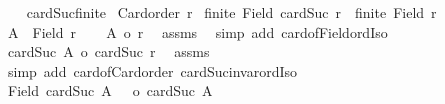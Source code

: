 \begin{isabellebody}
\ \ \isamarkupfalse%
\isanewline
{}\isamarkupfalse%
%
\endisatagproof
{\isafoldproof}%
%
\isadelimproof
\isanewline
%
\endisadelimproof
\isanewline
{}\isamarkupfalse%
\ cardSuc{\isacharunderscore}{\kern0pt}finite{\isacharcolon}{\kern0pt}\isanewline
{}\ {\isachardoublequoteopen}Card{\isacharunderscore}{\kern0pt}order\ r{\isachardoublequoteclose}\isanewline
{}\ {\isachardoublequoteopen}finite\ {\isacharparenleft}{\kern0pt}Field\ {\isacharparenleft}{\kern0pt}cardSuc\ r{\isacharparenright}{\kern0pt}{\isacharparenright}{\kern0pt}\ {\isacharequal}{\kern0pt}\ finite\ {\isacharparenleft}{\kern0pt}Field\ r{\isacharparenright}{\kern0pt}{\isachardoublequoteclose}\isanewline
%
\isadelimproof
%
\endisadelimproof
%
\isatagproof
{}\isamarkupfalse%
{\isacharminus}{\kern0pt}\isanewline
\ \ \isamarkupfalse%
\ {\isacharquery}{\kern0pt}A\ {\isacharequal}{\kern0pt}\ {\isachardoublequoteopen}Field\ r{\isachardoublequoteclose}\isanewline
\ \ \isamarkupfalse%
\ {\isachardoublequoteopen}{\isacharbar}{\kern0pt}{\isacharquery}{\kern0pt}A{\isacharbar}{\kern0pt}\ {\isacharequal}{\kern0pt}o\ r{\isachardoublequoteclose}\ \isamarkupfalse%
\ assms\ \isamarkupfalse%
\ {\isacharparenleft}{\kern0pt}simp\ add{\isacharcolon}{\kern0pt}\ card{\isacharunderscore}{\kern0pt}of{\isacharunderscore}{\kern0pt}Field{\isacharunderscore}{\kern0pt}ordIso{\isacharparenright}{\kern0pt}\isanewline
\ \ \isamarkupfalse%
\ {\isachardoublequoteopen}cardSuc\ {\isacharbar}{\kern0pt}{\isacharquery}{\kern0pt}A{\isacharbar}{\kern0pt}\ {\isacharequal}{\kern0pt}o\ cardSuc\ r{\isachardoublequoteclose}\ \isamarkupfalse%
\ assms\isanewline
\ \ \isamarkupfalse%
\ {\isacharparenleft}{\kern0pt}simp\ add{\isacharcolon}{\kern0pt}\ card{\isacharunderscore}{\kern0pt}of{\isacharunderscore}{\kern0pt}Card{\isacharunderscore}{\kern0pt}order\ cardSuc{\isacharunderscore}{\kern0pt}invar{\isacharunderscore}{\kern0pt}ordIso{\isacharparenright}{\kern0pt}\isanewline
\ \ \isamarkupfalse%
\ \isamarkupfalse%
\ {\isachardoublequoteopen}{\isacharbar}{\kern0pt}Field\ {\isacharparenleft}{\kern0pt}cardSuc\ {\isacharbar}{\kern0pt}{\isacharquery}{\kern0pt}A{\isacharbar}{\kern0pt}\ {\isacharparenright}{\kern0pt}\ {\isacharbar}{\kern0pt}\ {\isacharequal}{\kern0pt}o\ cardSuc\ {\isacharbar}{\kern0pt}{\isacharquery}{\kern0pt}A{\isacharbar}{\kern0pt}{\isachardoublequoteclose}\isanewline
\ \ \isamarkupfalse%

\end{isabellebody}

